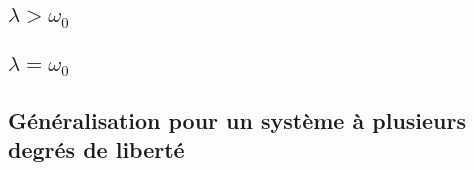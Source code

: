 \subsection{$\lambda > \omega_{0}$}

\subsection{$\lambda = \omega_{0}$}

\subsection{G\'{e}n\'{e}ralisation pour un syst\`{e}me \`{a} plusieurs degr\'{e}s de libert\'{e}}